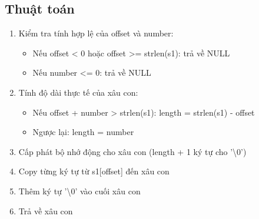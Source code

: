 \documentclass[12pt,a4paper]{article}
\begin{document}
\subsection{Thuật toán}
\begin{enumerate}
    \item Kiểm tra tính hợp lệ của offset và number:
    \begin{itemize}
        \item Nếu offset < 0 hoặc offset >= strlen(s1): trả về NULL
        \item Nếu number <= 0: trả về NULL
    \end{itemize}
    \item Tính độ dài thực tế của xâu con:
    \begin{itemize}
        \item Nếu offset + number > strlen(s1): length = strlen(s1) - offset
        \item Ngược lại: length = number
    \end{itemize}
    \item Cấp phát bộ nhớ động cho xâu con (length + 1 ký tự cho '\textbackslash0')
    \item Copy từng ký tự từ s1[offset] đến xâu con
    \item Thêm ký tự '\textbackslash0' vào cuối xâu con
    \item Trả về xâu con
\end{enumerate}
\end{document}
